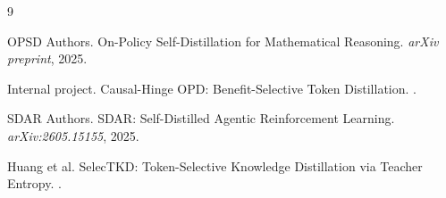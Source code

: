 \documentclass[11pt]{article}
\begin{document}

\begin{thebibliography}{9}

OPSD Authors.
\newblock On-Policy Self-Distillation for Mathematical Reasoning.
\newblock \emph{arXiv preprint}, 2025.

Internal project.
\newblock Causal-Hinge OPD: Benefit-Selective Token Distillation.
.

SDAR Authors.
\newblock SDAR: Self-Distilled Agentic Reinforcement Learning.
\newblock \emph{arXiv:2605.15155}, 2025.

Huang et al.
\newblock SelecTKD: Token-Selective Knowledge Distillation via Teacher Entropy.
.

\end{thebibliography}
\end{document}
